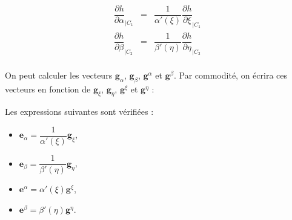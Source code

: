 \begin{equation}
\begin{array}{rcl}
\dfrac{\partial h}{\partial \alpha}_{|C_1} & = &  \dfrac{1}{\alpha'(\xi)} \dfrac{\partial h}{\partial \xi}_{|C_1} \\
\dfrac{\partial h}{\partial \beta}_{|C_2} & = &  \dfrac{1}{\beta'(\eta)} \dfrac{\partial h}{\partial \eta}_{|C_2} \\
\end{array}
\label{eq: derivee partiel link}
\end{equation}






On peut calculer les vecteurs $\mathbf{g}_{\alpha}$, $\mathbf{g}_{\beta}$, $\mathbf{g}^{\alpha}$ et $\mathbf{g}^{\beta}$. Par commodité, on écrira ces vecteurs en fonction de $\mathbf{g}_{\xi}$, $\mathbf{g}_{\eta}$, $\mathbf{g}^{\xi}$ et $\mathbf{g}^{\eta}$ :

\begin{proposition}
Les expressions suivantes sont vérifiées :
\begin{itemize}
\item $\mathbf{e}_{\alpha} = \dfrac{1}{\alpha'(\xi)} \mathbf{g}_{\xi}$,
\item $\mathbf{e}_{\beta} = \dfrac{1}{\beta'(\eta)} \mathbf{g}_{\eta}$,
\item $\mathbf{e}^{\alpha} = \alpha'(\xi) \mathbf{g}^{\xi}$,
\item $\mathbf{e}^{\beta} = \beta'(\eta) \mathbf{g}^{\eta}$.
\end{itemize}
\label{prop: g_alpha g_beta fct de g_xi g_eta}
\end{proposition}

